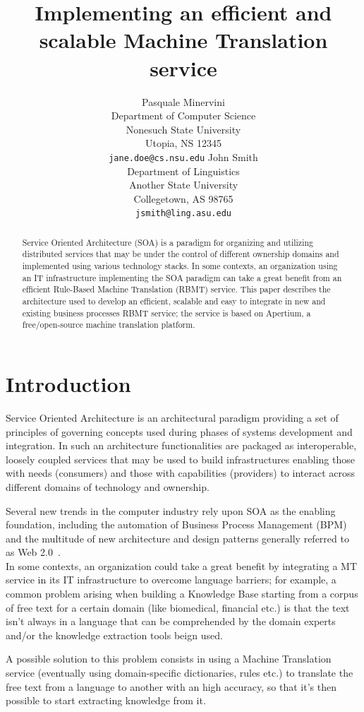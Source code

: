 \documentclass[11pt]{article}
\title{Implementing an efficient and scalable Machine Translation service}
\author{Pasquale Minervini\\
  Department of Computer Science \\
  Nonesuch State University \\
  Utopia, NS 12345 \\
  {\tt jane.doe@cs.nsu.edu} \And
  John Smith \\
  Department of Linguistics \\
  Another State University \\
  Collegetown, AS 98765 \\  
  {\tt jsmith@ling.asu.edu}}
\date{}
\begin{document}
\maketitle

\begin{abstract}
Service Oriented Architecture (SOA) is a paradigm for organizing and utilizing distributed services that may be under the 
control of different ownership domains and implemented using various technology stacks. In some contexts, an organization
using an IT infrastructure implementing the SOA paradigm can take a great benefit from an efficient Rule-Based Machine 
Translation (RBMT) service. This paper describes the architecture used to develop an efficient, scalable and easy to integrate
in new and existing business processes RBMT service; the service is based on Apertium, a free/open-source machine translation platform.
\end{abstract}

\section{Introduction}

Service Oriented Architecture is an architectural paradigm providing  a set of principles of governing concepts used during phases 
of systems development and integration. In such an architecture functionalities are packaged as interoperable, loosely coupled
services that may be used to build infrastructures enabling those with needs (consumers) and those with capabilities (providers) 
to interact across different domains of technology and ownership.

Several new trends in the computer industry rely upon SOA as the enabling foundation, including the automation of Business Process 
Management (BPM) and the multitude of new architecture and design patterns generally referred to as Web 2.0~\cite{web20}.\\

In some contexts, an organization could take a great benefit by integrating a MT service in its IT infrastructure to overcome 
language barriers; for example, a common problem arising when building a Knowledge Base starting from a corpus of free text for
a certain domain (like biomedical, financial etc.) is that the text isn't always in a language that can be comprehended by the
domain experts and/or the knowledge extraction tools beign used.

A possible solution to this problem consists in using a Machine
Translation service (eventually using domain-specific dictionaries, rules etc.) to translate the free text from a language to
another with an high accuracy, so that it's then possible to start extracting knowledge from it.\\
\end{document}
